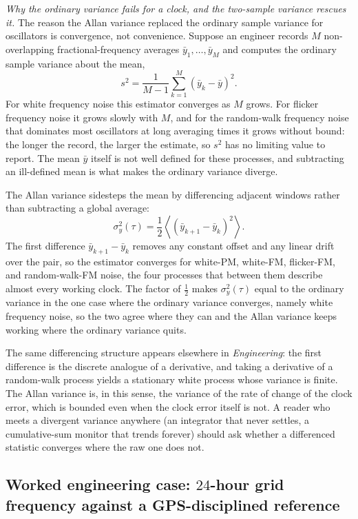 \begin{mastery}
\textit{Why the ordinary variance fails for a clock, and the
two-sample variance rescues it.} The reason the Allan variance
replaced the ordinary sample variance for oscillators is
convergence, not convenience. Suppose an engineer records $M$
non-overlapping fractional-frequency averages $\bar y_1, \ldots,
\bar y_M$ and computes the ordinary sample variance about the mean,
\[
s^2 = \frac{1}{M-1} \sum_{k=1}^{M} (\bar y_k - \bar y)^2 .
\]
For white frequency noise this estimator converges as $M$ grows.
For flicker frequency noise it grows slowly with $M$, and for the
random-walk frequency noise that dominates most oscillators at long
averaging times it grows without bound: the longer the record, the
larger the estimate, so $s^2$ has no limiting value to report. The
mean $\bar y$ itself is not well defined for these processes, and
subtracting an ill-defined mean is what makes the ordinary variance
diverge.

The Allan variance sidesteps the mean by differencing adjacent
windows rather than subtracting a global average:
\[
\sigma_y^2(\tau) = \frac{1}{2} \left\langle (\bar y_{k+1} -
\bar y_k)^2 \right\rangle .
\]
The first difference $\bar y_{k+1} - \bar y_k$ removes any constant
offset and any linear drift over the pair, so the estimator converges
for white-PM, white-FM, flicker-FM, and random-walk-FM noise, the
four processes that between them describe almost every working clock.
The factor of $\tfrac{1}{2}$ makes $\sigma_y^2(\tau)$ equal to the
ordinary variance in the one case where the ordinary variance
converges, namely white frequency noise, so the two agree where they
can and the Allan variance keeps working where the ordinary variance
quits.

The same differencing structure appears elsewhere in \emph{Engineering}:
the first difference is the discrete analogue of a derivative, and
taking a derivative of a random-walk process yields a stationary
white process whose variance is finite. The Allan variance is, in
this sense, the variance of the rate of change of the clock error,
which is bounded even when the clock error itself is not. A reader
who meets a divergent variance anywhere (an integrator that never
settles, a cumulative-sum monitor that trends forever) should ask
whether a differenced statistic converges where the raw one does not.
\end{mastery}

\subsection{Worked engineering case: $24$-hour grid frequency
against a GPS-disciplined reference}

